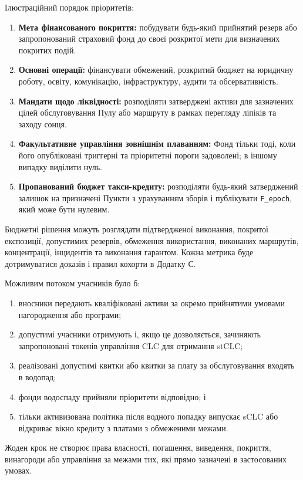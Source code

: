 \documentclass[11pt]{article}
\begin{document}
Ілюстраційний порядок пріоритетів:

\begin{enumerate}[leftmargin=*]
\item \textbf{Мета фінансованого покриття:} побудувати будь-який прийнятий резерв або запропонований страховий фонд до своєї розкритої мети для визначених покритих подій.
\item \textbf{Основні операції:} фінансувати обмежений, розкритий бюджет на юридичну роботу, освіту, комунікацію, інфраструктуру, аудити та обсервативність.
\item \textbf{Мандати щодо ліквідності:} розподіляти затверджені активи для зазначених цілей обслуговування Пулу або маршруту в рамках перегляду ліпіків та заходу сонця.
\item \textbf{Факультативне управління зовнішнім плаванням:} Фонд тільки тоді, коли його опубліковані триггерні та пріоритетні пороги задоволені; в іншому випадку виділити нуль.
\item \textbf{Пропанований бюджет такси-кредиту:} розподіляти будь-який затверджений залишок на призначені Пункти з урахуванням зборів і публікувати \texttt{F\_epoch}, який може бути нулевим.
\end{enumerate}
Бюджетні рішення можуть розглядати підтвердженої виконання, покритої експозиції, допустимих резервів, обмеження використання, виконаних маршрутів, концентрації, інцидентів та виконання гарантом. Кожна метрика буде дотримуватися доказів і правил кохорти в Додатку С.

Можливим потоком учасників було б:

\begin{enumerate}[leftmargin=*]
\item вносники передають кваліфіковані активи за окремо прийнятими умовами нагородження або програми;
\item допустимі учасники отримують і, якщо це дозволяється, зачиняють запропоновані токенів управління CLC для отримання stCLC;
\item реалізовані допустимі квитки або квитки за плату за обслуговування входять в водопад;
\item фонди водоспаду прийняли пріоритети відповідно; і
\item тільки активизована політика після водного попадку випускає sCLC або відкриває вікно кредиту з платами з обмеженими межами.
\end{enumerate}
Жоден крок не створює права власності, погашення, виведення, покриття, винагороди або управління за межами тих, які прямо зазначені в застосованих умовах.
\end{document}
